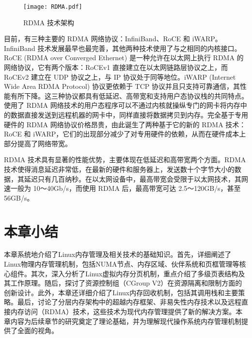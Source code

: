 \begin{figure}[h]
    \centering
    \texttt{[image: RDMA.pdf]}
    \caption{RDMA 技术架构}
    \label{fig:RDMA}
\end{figure}

目前，有三种主要的 RDMA 网络协议：InfiniBand、RoCE 和 iWARP。InfiniBand 技术发展最早也最完善，其他两种技术使用了与之相同的内核接口。RoCE (RDMA over Converged Ethernet) 是一种允许在以太网上执行 RDMA 的网络协议，它有两个版本：RoCEv1 直接建立在以太网链路层协议之上，而 RoCEv2 建立在 UDP 协议之上，与 IP 协议处于同等地位。iWARP (Internet Wide Area RDMA Protocol) 协议更依赖于 TCP 协议并且只支持可靠通信，其性能有所下降。这三种协议都具有低延迟、高带宽和支持用户态协议栈的共同特点。使用了 RDMA 网络技术的用户态程序可以不通过内核就操纵专门的网卡将内存中的数据直接发送到远程机器的网卡中，同样直接将数据拷贝到内存。完全基于专用硬件的 RDMA 网络协议价格昂贵，由此诞生了两种基于它的新的 RDMA 技术：RoCE 和 iWARP，它们的出现部分减少了对专用硬件的依赖，从而在硬件成本上部分提高了网络带宽。

RDMA 技术具有显著的性能优势，主要体现在低延迟和高带宽两个方面。RDMA 技术使得消息延迟非常低，在最新的硬件和服务器上，发送数十个字节大小的数据，其延迟只有几百纳秒。在以太网设备中，最高带宽会受限于以太网技术，其网速一般为 10～40Gb/s，而使用 RDMA 后，最高带宽可达 2.5～120GB/s，甚至 56GB/s。

\section{本章小结}

本章系统地介绍了Linux内存管理及相关技术的基础知识。首先，详细阐述了Linux物理内存管理机制，包括NUMA节点、内存区域、伙伴系统和页框管理等核心组件。其次，深入分析了Linux虚拟内存分页机制，重点介绍了多级页表结构及其工作原理。随后，探讨了资源控制组（CGroup V2）在资源隔离和限制方面的创新设计。此外，本章还详细介绍了Linux内存回收机制，包括其调用栈和主要策略。最后，讨论了分层内存架构中的超越内存框架、非易失性内存技术以及远程直接内存访问（RDMA）技术，这些技术为现代内存管理提供了新的解决方案。本章内容为后续章节的研究奠定了理论基础，并为理解现代操作系统内存管理机制提供了全面的视角。